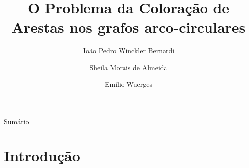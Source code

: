 \documentclass[xcolor=table]{beamer}
\title{O Problema da Coloração de Arestas nos grafos arco-circulares}
\author{João Pedro Winckler Bernardi\inst{1}  \and Sheila Morais de
  Almeida\inst{2} \and Emílio Wuerges\inst{1}}
\institute[Universidade Federal da Fronteira Sul and Universidade Tecnológica do Paraná] %
{
  \inst{1}%
  Universidade Federal da Fronteira Sul (UFFS)
  \and
  \inst{2}%
  Universidade Tecnológica do Paraná (UTFPR)}
\theoremstyle{sememph}
\begin{document}
\begin{frame}
  \titlepage
\end{frame}

\begin{frame}{Sumário}
  \tableofcontents[hideallsubsections]
\end{frame}

\section{Introdução}

\end{document}
